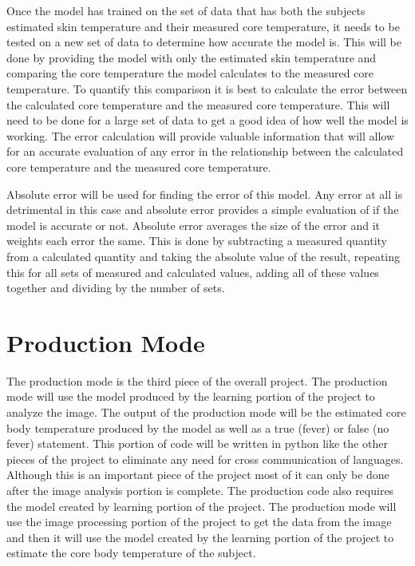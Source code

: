 ﻿\documentclass[onecolumn, draftclsnofoot,10pt, compsoc]{IEEEtran}
\begin{document}
Once the model has trained on the set of data that has both the subjects estimated skin temperature and their measured core temperature, it needs to be tested on a new set of data to determine how accurate the model is. This will be done by providing the model with only the estimated skin temperature and comparing the core temperature the model calculates to the measured core temperature. To quantify this comparison it is best to calculate the error between the calculated core temperature and the measured core temperature. This will need to be done for a large set of data to get a good idea of how well the model is working. The error calculation will provide valuable information that will allow for an accurate evaluation of any error in the relationship between the calculated core temperature and the measured core temperature. 

Absolute error will be used for finding the error of this model. Any error at all is detrimental in this case and absolute error provides a simple evaluation of if the model is accurate or not. Absolute error averages the size of the error and it weights each error the same. This is done by subtracting a measured quantity from a calculated quantity and taking the absolute value of the result, repeating this for all sets of measured and calculated values, adding all of these values together and dividing by the number of sets. \cite{BiancaTech}

\section{Production Mode}
The production mode is the third piece of the overall project. The production mode will use the model produced by the learning portion of the project to analyze the image. The output of the production mode will be the estimated core body temperature produced by the model as well as a true (fever) or false (no fever) statement. This portion of code will be written in python like the other pieces of the project to eliminate any need for cross communication of languages. Although this is an important piece of the project most of it can only be done after the image analysis portion is complete. The production code also requires the model created by learning portion of the project. The production mode will use the image processing portion of the project to get the data from the image and then it will use the model created by the learning portion of the project to estimate the core body temperature of the subject. 
\end{document}
